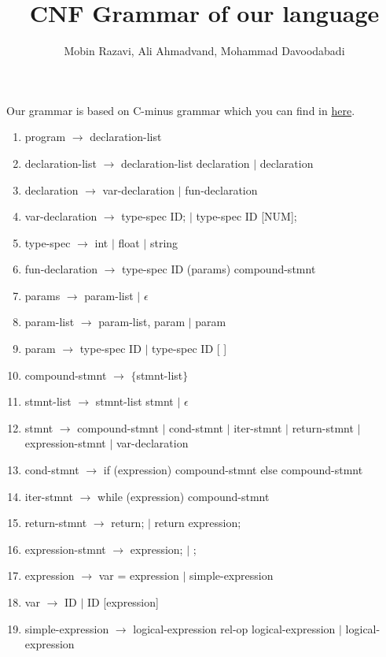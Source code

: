 \documentclass{article}
\begin{document}
\title{CNF Grammar of our language}
\author{Mobin Razavi, Ali Ahmadvand, Mohammad Davoodabadi}
\date{}
\maketitle
Our grammar is based on C-minus grammar which you can find in \href{http://www.csci-snc.com/resources/ExamplesX/C-Syntax.pdf}{here}.
\begin{enumerate}
    \item program $\rightarrow$ declaration-list
    \item declaration-list $\rightarrow$ declaration-list   declaration $|$ declaration
    \item declaration $\rightarrow$ var-declaration $|$ fun-declaration
    \item var-declaration $\rightarrow$ type-spec ID; $|$ type-spec ID [NUM];
    \item type-spec $\rightarrow$ int $|$ float $|$ string
    \item fun-declaration $\rightarrow$ type-spec ID (params) compound-stmnt
    \item params $\rightarrow$ param-list $|$ $\epsilon$ 
    \item param-list $\rightarrow$ param-list, param $|$ param
    \item param $\rightarrow$ type-spec ID $|$ type-spec ID [ ]
    \item compound-stmnt $\rightarrow$ $\{$stmnt-list$\}$
    \item stmnt-list $\rightarrow$ stmnt-list stmnt $|$ $\epsilon$
    \item stmnt $\rightarrow$ compound-stmnt $|$ cond-stmnt $|$ iter-stmnt $|$ return-stmnt $|$ expression-stmnt $|$ var-declaration
    \item cond-stmnt $\rightarrow$ if (expression) compound-stmnt else compound-stmnt
    \item iter-stmnt $\rightarrow$ while (expression) compound-stmnt
    \item return-stmnt $\rightarrow$ return; $|$ return expression;
    \item expression-stmnt $\rightarrow$ expression; $|$ ;
    \item expression $\rightarrow$ var = expression $|$ simple-expression
    \item var $\rightarrow$ ID $|$ ID [expression]
    \item simple-expression $\rightarrow$ logical-expression rel-op logical-expression $|$ logical-expression

\end{enumerate}
\end{document}

